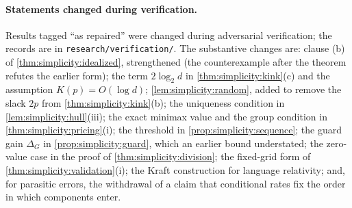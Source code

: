 \paragraph{Statements changed during verification.} Results tagged ``as repaired'' were changed during adversarial verification; the records are in \texttt{research/verification/}. The substantive changes are: clause (b) of \cref{thm:simplicity:idealized}, strengthened (the counterexample after the theorem refutes the earlier form); the term $2\log_2d$ in \cref{thm:simplicity:kink}(c) and the assumption $K(p)=O(\log d)$; \cref{lem:simplicity:random}, added to remove the slack $2p$ from \cref{thm:simplicity:kink}(b); the uniqueness condition in \cref{lem:simplicity:hull}(iii); the exact minimax value and the group condition in \cref{thm:simplicity:pricing}(i); the threshold in \cref{prop:simplicity:sequence}; the guard gain $\Delta_G$ in \cref{prop:simplicity:guard}, which an earlier bound understated; the zero-value case in the proof of \cref{thm:simplicity:division}; the fixed-grid form of \cref{thm:simplicity:validation}(i); the Kraft construction for language relativity; and, for parasitic errors, the withdrawal of a claim that conditional rates fix the order in which components enter.

